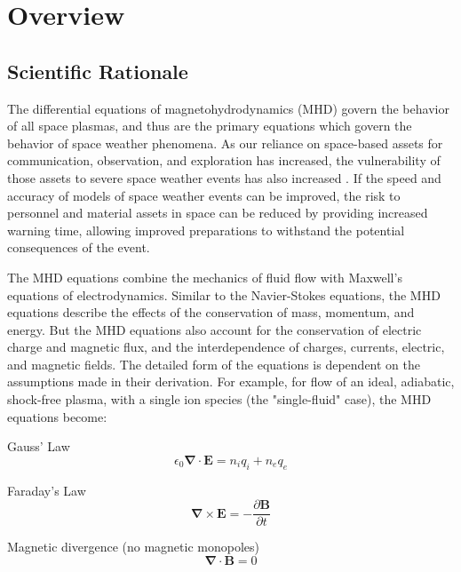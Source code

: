 \documentclass{article}
\begin{document}
\newpage

\section{Overview}

\subsection{Scientific Rationale}

The differential equations of magnetohydrodynamics (MHD) govern the behavior of all space plasmas, and thus are the primary equations which govern the behavior of space weather phenomena. As our reliance on space-based assets for communication, observation, and exploration has increased, the vulnerability of those assets to severe space weather events has also increased \cite{NRC2009}. If the speed and accuracy of models of space weather events can be improved, the risk to personnel and material assets in space can be reduced by providing increased warning time, allowing improved preparations to withstand the potential consequences of the event.

The MHD equations combine the mechanics of fluid flow with Maxwell's equations of electrodynamics. Similar to the Navier-Stokes equations, the MHD equations describe the effects of the conservation of mass, momentum, and energy. But the MHD equations also account for the conservation of electric charge and magnetic flux, and the interdependence of charges, currents, electric, and magnetic fields. The detailed form of the equations is dependent on the assumptions made in their derivation. For example, for flow of an ideal, adiabatic, shock-free plasma, with a single ion species (the "single-fluid" case), the MHD equations \cite{Chen1984} become:

\bigskip

Gauss' Law
\begin{equation}
    \epsilon_0 \mathbf \nabla \cdotp \mathbf E = n_i q_i + n_e q_e
    \label{eq:GaussLaw}
\end{equation}

Faraday's Law
\begin{equation}
    \mathbf \nabla \times \mathbf E = -\frac {\partial \mathbf B} {\partial t}
    \label{eq:FaradayLaw}
\end{equation}

Magnetic divergence (no magnetic monopoles)
\begin{equation}
  \mathbf \nabla \cdotp \mathbf B = 0
  \label{eq:mhd_MagneticDivergence}
\end{equation}
\end{document}
